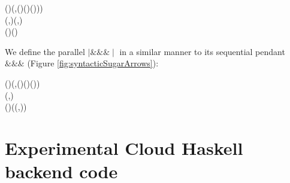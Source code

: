 \documentclass[paper=A4,twoside=true,openright,parskip=full,chapterprefix=true,headings=normal,bibliography=totoc,listof=totoc,titlepage=on,captions=tableabove,draft=false,british]{scrreprt}%
\begin{document}
\begin{hscode}\SaveRestoreHook
{}%
%
%
\>[B]{}(\mathbin{\mid\!\!*\!*\!*\!\!\mid})\mathbin{::}(\;,\;\;(\;\;)\;(\;\;)\;()))\Rightarrow {}\<[E]%
\\
\>[B]{}\<[5]%
\>[5]{}\;\;\to {}\;\;\to {}\;(,)\;(,){}\<[E]%
\\
\>[B]{}(\mathbin{\mid\!\!*\!*\!*\!\!\mid})\mathrel{=}\;(){}\<[E]%
\ColumnHook
\end{hscode}\resethooks
\vspace{-2\baselineskip}

We define the parallel \ensuremath{\mathbin{\mid\!\!\&\!\&\!\&\!\!\mid}} in a similar manner to its sequential
pendant \ensuremath{\mathbin{\&\!\&\!\&}} (Figure \ref{fig:syntacticSugarArrows}):


\begin{hscode}\SaveRestoreHook
{}%
%
%
\>[B]{}(\mathbin{\mid\!\!\&\!\&\!\&\!\!\mid})\mathbin{::}(\;,\;\;(\;\;)\;(\;\;)\;())\Rightarrow {}\<[E]%
\\
\>[B]{}\<[5]%
\>[5]{}\;\;\to {}\;\;\to {}\;\;(,){}\<[E]%
\\
\>[B]{}(\mathbin{\mid\!\!\&\!\&\!\&\!\!\mid})\;\;\mathrel{=}(\mathbin{\$}\lambda {}\to (,))\mathbin{>\!\!>\!\!>}\mathbin{\mid\!\!*\!*\!*\!\!\mid}\<[E]%
\ColumnHook
\end{hscode}\resethooks
\vspace{-2\baselineskip}

\newpage

\hypertarget{experimental-cloud-haskell-backend-code}{%
\section{Experimental Cloud Haskell backend
code}\label{experimental-cloud-haskell-backend-code}}
\end{document}
